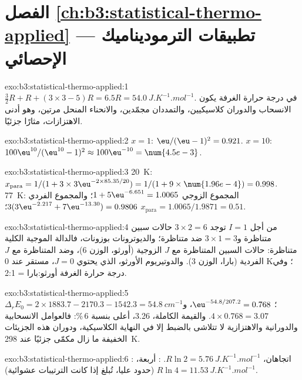 \section*{الفصل \ref{ch:b3:statistical-thermo-applied} --- تطبيقات الترموديناميك الإحصائي}

\begin{solution}{exo:b3:statistical-thermo-applied:1}
$\frac32R + R + (3 \times 3 - 5)R = 6.5R = \qty{54.0}{J.K^{-1}.mol^{-1}}$. في درجة حرارة الغرفة يكون الانسحاب
والدوران كلاسيكيين، والتمددان مجمّدين، والانحناء المنحل
مرتين، وهو أدنى الاهتزازات، مثارًا جزئيًا.
\end{solution}

\begin{solution}{exo:b3:statistical-thermo-applied:2}
$x = 1$: $\eu/(\eu - 1)^2 = 0.921$. $x = 10$: $100\eu^{10}/(\eu^{10} - 1)^2 \approx 100\eu^{-10} = \num{4.5e-3}$.
\end{solution}

\begin{solution}{exo:b3:statistical-thermo-applied:3}
\qty{20}{K}: $x_{\mathrm{para}} = 1/(1 + 3 \times 3\eu^{-2 \times 85.35/20}) = 1/(1 + 9 \times \num{1.96e-4}) = 0.998$.
\qty{77}{K}: المجموع الزوجي $1 + 5\eu^{-6.651} = 1.0065$؛ والمجموع الفردي $3(3\eu^{-2.217} + 7\eu^{-13.30}) = 0.9806$؛
$x_{\mathrm{para}} = 1.0065/1.9871 = 0.51$.
\end{solution}

\begin{solution}{exo:b3:statistical-thermo-applied:4}
من أجل $I = 1$ توجد $3 \times 2 = 6$ حالات سبين متناظرة و$3 \times 1 = 3$ ضد متناظرة؛
والديوترونات بوزونات، فالدالة الموجية الكلية متناظرة: حالات السبين المتناظرة
مع $J$ الزوجية (أورثو، الوزن 6)، وضد المتناظرة مع $J$ الفردية (بارا، الوزن
3). والدوتيريوم الأورثو، الذي يحتوي $J = 0$، مستقر عند 0 K؛ وفي درجة حرارة الغرفة
أورثو:بارا = 2:1.
\end{solution}

\begin{solution}{exo:b3:statistical-thermo-applied:5}
$\Delta_rE_0 = 2 \times 1883.7 - 2170.3 - 1542.3 = \qty{54.8}{cm^{-1}}$؛ $\eu^{-54.8/207.2} = 0.768$، 
و$4 \times 0.768 = 3.07$. والقيمة الكاملة، 3.26، أعلى بنسبة 6\,\%: فالعوامل الانسحابية والدورانية
والاهتزازية لا تتلاشى بالضبط إلا في النهاية الكلاسيكية، 
ودوران هذه الجزيئات الخفيفة ما زال مكمّى جزئيًا عند \qty{298}{K}.
\end{solution}

\begin{solution}{exo:b3:statistical-thermo-applied:6}
: اتجاهان، $R\ln2 = \qty{5.76}{J.K^{-1}.mol^{-1}}$. : أربعة، $R\ln4 =
\qty{11.53}{J.K^{-1}.mol^{-1}}$ (حدود عليا، تُبلغ إذا كانت الترتيبات عشوائية).
\end{solution}

